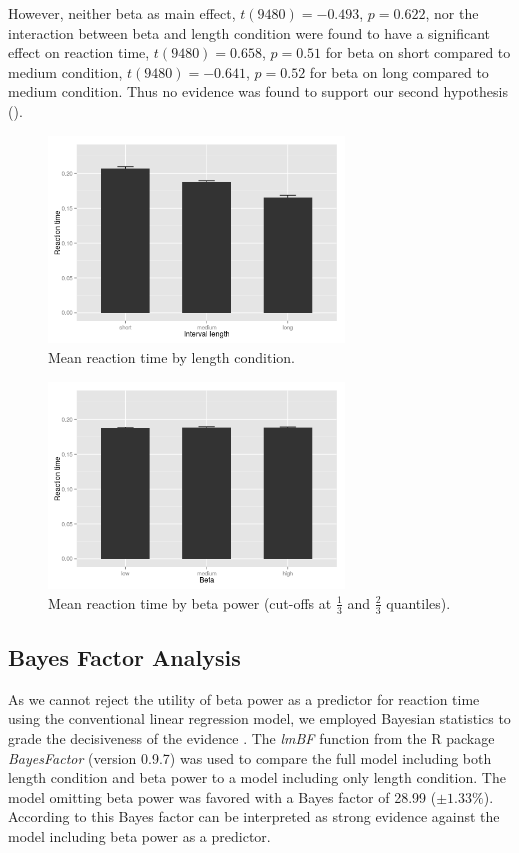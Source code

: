 \documentclass[man,floatsintext]{apa6} %
\begin{document}
However, neither beta as main effect, $t(9480) = -0.493$, $p = 0.622$,
nor the interaction between beta and length condition were found to
have a significant effect on reaction time, $t(9480) = 0.658$, $p =
0.51$ for beta on short compared to medium condition, $t(9480) =
-0.641$, $p = 0.52$ for beta on long compared to medium
condition. Thus no evidence was found to support our second hypothesis
().

\begin{figure}[!h]
  \includegraphics[width=0.7\textwidth]{actual_rt_by_length}
  \caption{Mean reaction time by length condition.}
  \label{fig:rt_by_length}
\end{figure}

\begin{figure}[!h]
  \includegraphics[width=0.7\textwidth]{actual_rt_by_beta}
  \caption{Mean reaction time by beta power (cut-offs at $\frac{1}{3}$ and $\frac{2}{3}$ quantiles).}
  \label{fig:rt_by_beta}
\end{figure}

\subsection{Bayes Factor Analysis}
As we cannot reject the utility of beta power as a predictor for
reaction time using the conventional linear regression model, we
employed Bayesian statistics to grade the decisiveness of the evidence
\cite{jeffreys_theory_1961}. The \emph{lmBF} function from the R
package \emph{BayesFactor} (version 0.9.7) was used to compare the
full model including both length condition and beta power to a model
including only length condition. The model omitting beta power was
favored with a Bayes factor of 28.99 ($\pm 1.33\%$). According to
 this Bayes factor can be interpreted as
strong evidence against the model including beta power as a predictor.
\end{document}
